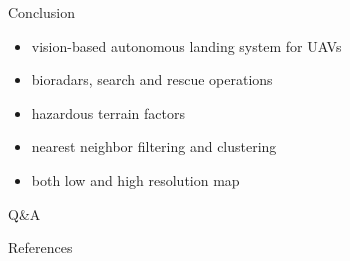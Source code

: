 \documentclass[10pt]{beamer}
\begin{document}
    \begin{frame}{Conclusion}
        \begin{itemize}
            \item vision-based autonomous landing system for UAVs
            \item bioradars, search and rescue operations
            \item hazardous terrain factors
            \item nearest neighbor filtering and clustering
            \item both low and high resolution map 
        \end{itemize}
    \end{frame}

    \begin{frame}[standout]
        Q\&A
    \end{frame}

    \appendix

    \begin{frame}{References}
        
        
    \end{frame}
\end{document}

